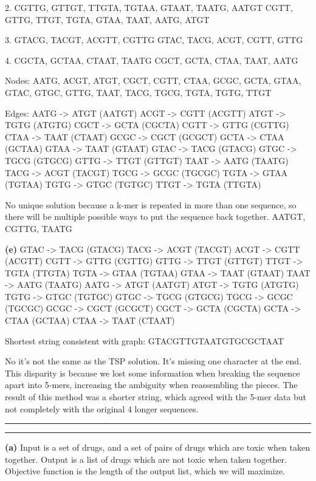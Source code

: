 \documentclass[11pt,letterpaper]{article}
\newcommand{\question}[1] {\vspace{.25in} \hrule\vspace{0.5em}
\noindent{\bf #1} \vspace{0.5em}
\hrule \vspace{.10in}}
\renewcommand{\part}[1] {\vspace{.10in} {\bf (#1)}}
\begin{document}
2.
CGTTG, GTTGT, TTGTA, TGTAA, GTAAT, TAATG, AATGT
CGTT, GTTG, TTGT, TGTA, GTAA, TAAT, AATG, ATGT

3.
GTACG, TACGT, ACGTT, CGTTG
GTAC, TACG, ACGT, CGTT, GTTG

4.
CGCTA, GCTAA, CTAAT, TAATG
CGCT, GCTA, CTAA, TAAT, AATG

Nodes:
AATG, ACGT, ATGT, CGCT, CGTT, CTAA, GCGC, GCTA, GTAA, GTAC, GTGC, GTTG, TAAT, TACG, TGCG, TGTA, TGTG, TTGT

Edges:
AATG -> ATGT (AATGT)
ACGT -> CGTT (ACGTT)
ATGT -> TGTG (ATGTG)
CGCT -> GCTA (CGCTA)
CGTT -> GTTG (CGTTG)
CTAA -> TAAT (CTAAT)
GCGC -> CGCT (GCGCT)
GCTA -> CTAA (GCTAA)
GTAA -> TAAT (GTAAT)
GTAC -> TACG (GTACG)
GTGC -> TGCG (GTGCG)
GTTG -> TTGT (GTTGT)
TAAT -> AATG (TAATG)
TACG -> ACGT (TACGT)
TGCG -> GCGC (TGCGC)
TGTA -> GTAA (TGTAA)
TGTG -> GTGC (TGTGC)
TTGT -> TGTA (TTGTA)

No unique solution because a k-mer is repeated in more than one sequence, so there will be multiple possible ways to put the sequence back together.
AATGT, CGTTG, TAATG

\part{e}
GTAC -> TACG (GTACG)
TACG -> ACGT (TACGT)
ACGT -> CGTT (ACGTT)
CGTT -> GTTG (CGTTG)
GTTG -> TTGT (GTTGT)
TTGT -> TGTA (TTGTA)
TGTA -> GTAA (TGTAA)
GTAA -> TAAT (GTAAT)
TAAT -> AATG (TAATG)
AATG -> ATGT (AATGT)
ATGT -> TGTG (ATGTG)
TGTG -> GTGC (TGTGC)
GTGC -> TGCG (GTGCG)
TGCG -> GCGC (TGCGC)
GCGC -> CGCT (GCGCT)
CGCT -> GCTA (CGCTA)
GCTA -> CTAA (GCTAA)
CTAA -> TAAT (CTAAT)

Shortest string consistent with graph: GTACGTTGTAATGTGCGCTAAT

No it's not the same as the TSP solution. It's missing one character at the end.
This disparity is because we lost some information when breaking the sequence apart into 5-mers, increasing the ambiguity when reassembling the pieces.
The result of this method was a shorter string, which agreed with the 5-mer data but not completely with the original 4 longer sequences.

\question{4}
\part{a}
Input is a set of drugs, and a set of pairs of drugs which are toxic when taken together.
Output is a list of drugs which are not toxic when taken together.
Objective function is the length of the output list, which we will maximize.
\end{document}
